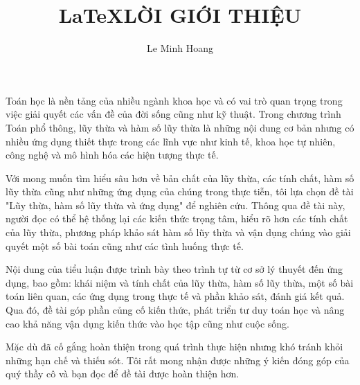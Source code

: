 \documentclass[a4paper]{article}
\title{LaTeX}
\author{Le Minh Hoang}
\date{}
\begin{document}
\maketitle
\title{LỜI GIỚI THIỆU}
Toán học là nền tảng của nhiều ngành khoa học và có vai trò quan trọng trong việc giải quyết các vấn đề của đời sống cũng như kỹ thuật. Trong chương trình Toán phổ thông, lũy thừa và hàm số lũy thừa là những nội dung cơ bản nhưng có nhiều ứng dụng thiết thực trong các lĩnh vực như kinh tế, khoa học tự nhiên, công nghệ và mô hình hóa các hiện tượng thực tế.

Với mong muốn tìm hiểu sâu hơn về bản chất của lũy thừa, các tính chất, hàm số lũy thừa cũng như những ứng dụng của chúng trong thực tiễn, tôi lựa chọn đề tài "Lũy thừa, hàm số lũy thừa và ứng dụng" để nghiên cứu. Thông qua đề tài này, người đọc có thể hệ thống lại các kiến thức trọng tâm, hiểu rõ hơn các tính chất của lũy thừa, phương pháp khảo sát hàm số lũy thừa và vận dụng chúng vào giải quyết một số bài toán cũng như các tình huống thực tế.

Nội dung của tiểu luận được trình bày theo trình tự từ cơ sở lý thuyết đến ứng dụng, bao gồm: khái niệm và tính chất của lũy thừa, hàm số lũy thừa, một số bài toán liên quan, các ứng dụng trong thực tế và phần khảo sát, đánh giá kết quả. Qua đó, đề tài góp phần củng cố kiến thức, phát triển tư duy toán học và nâng cao khả năng vận dụng kiến thức vào học tập cũng như cuộc sống.

Mặc dù đã cố gắng hoàn thiện trong quá trình thực hiện nhưng khó tránh khỏi những hạn chế và thiếu sót. Tôi rất mong nhận được những ý kiến đóng góp của quý thầy cô và bạn đọc để đề tài được hoàn thiện hơn.
\end{document}
